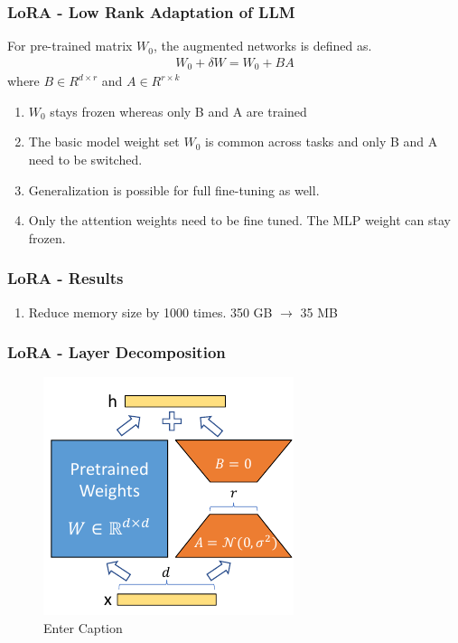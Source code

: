 \documentclass{beamer}
\theoremstyle{plain}
\theoremstyle{definition}
\theoremstyle{remark}
\numberwithin{equation}{section}
\numberwithin{figure}{section}
\numberwithin{theorem}{section}
\renewcommand{\to}{\longrightarrow}
\begin{document}
\begin{frame}[shrink]
\frametitle{LoRA - Low Rank Adaptation of LLM}
For pre-trained matrix $W_0$, the augmented networks is defined as.
\begin{align}
    W_0 + \delta W = W_0 + BA
\end{align}
where $B \in R^{d \times r}$ and $A\in R^{r\times k}$
\begin{enumerate}
\item $W_0$ stays frozen whereas only B and A are trained
\item The basic model weight set $W_0$ is common across tasks and only B and A need to be switched.
\item Generalization is possible for full fine-tuning as well.
\item Only the attention weights need to be fine tuned. The MLP weight can stay frozen.
\end{enumerate}
\end{frame}

\begin{frame}
\frametitle{LoRA - Results}
\begin{enumerate}
    \item Reduce memory size by 1000 times. 350 GB $\to$ 35 MB
\end{enumerate}
\end{frame}


\begin{frame}
\frametitle{LoRA - Layer Decomposition}
\begin{figure}
    \centering
    \includegraphics[width=0.5\linewidth]{lora.png}
    \caption{Enter Caption}
    \label{fig:enter-label}
\end{figure}
\end{frame}


                        
\end{document}
